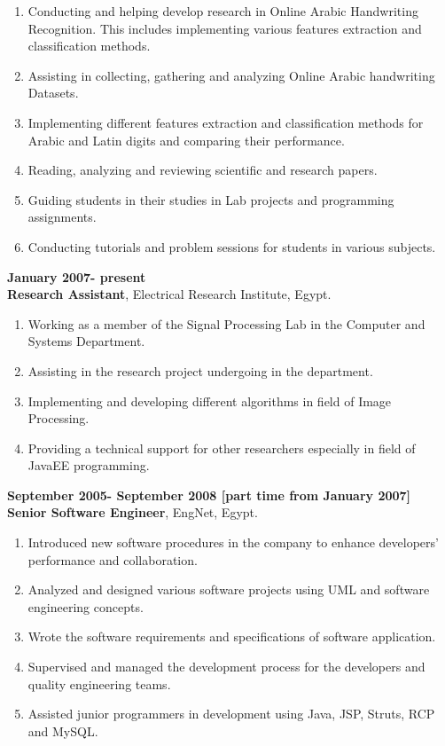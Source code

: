 \documentclass{article}
\begin{document}
 \begin{enumerate}
   \item Conducting and helping develop research in Online Arabic Handwriting
   Recognition. This includes implementing various features extraction and classification methods.
   \item Assisting in collecting, gathering and analyzing Online Arabic
   handwriting Datasets.
 \item Implementing different features extraction and classification methods for Arabic and Latin digits and comparing their performance.
 \item Reading, analyzing and reviewing scientific and research papers.
 \item Guiding students in their studies in Lab projects and programming
 assignments.
 \item Conducting tutorials and problem sessions for students in various
 subjects.
\end{enumerate}

 \textbf{January 2007- present}\\
 \textbf{Research Assistant}, Electrical Research Institute, Egypt.
 \begin{enumerate}
\item Working as a member of the Signal Processing Lab in the Computer and
Systems Department.
 \item Assisting in the research project undergoing in the department.
 \item Implementing and developing different algorithms in field of Image
 Processing.
 \item Providing a technical support for other researchers especially in field
 of JavaEE programming.
\end{enumerate}

 \textbf{September 2005- September 2008 [part time from January 2007] }\\
 \textbf{Senior Software Engineer}, EngNet, Egypt.

 \begin{enumerate}

\item Introduced new software procedures in the company to enhance developers'
performance and collaboration.
 \item Analyzed and designed various software projects using UML and software engineering concepts.
 \item Wrote the software requirements and specifications of software
 application.
 \item Supervised and managed the development process for the developers and
 quality engineering teams.
 \item Assisted junior programmers in development using Java, JSP, Struts, RCP and MySQL.
\end{enumerate}
\end{document}
